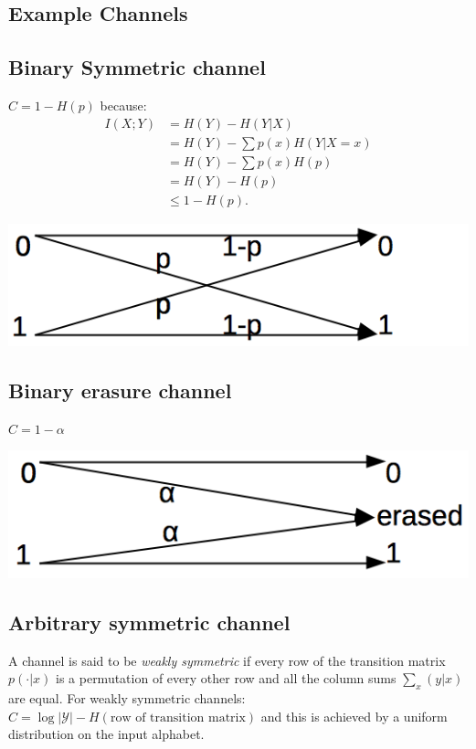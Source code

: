\documentclass[10pt,a4paper,landscape]{article}
\begin{document}
\begin{multicols*}{4}
\section{Example Channels}
\subsection{Binary Symmetric channel}
$C = 1 - H(p)$ because:
\begin{align*}
	I(X; Y) &= H(Y) - H(Y | X)\\
			&= H(Y) - \sum p(x) H(Y| X = x)\\
			&= H(Y) - \sum p(x) H(p)\\
			&= H(Y) - H(p)\\
			&\leq 1 - H(p).
\end{align*}
\begin{colfig}
	\centering
	\includegraphics[width=0.6\linewidth]{binary-symmetric-channel.png}
\end{colfig}

\subsection{Binary erasure channel}
$C = 1 - \alpha$
\begin{colfig}
	\centering
	\includegraphics[width=0.6\linewidth]{binary-erasure-channel.png}
\end{colfig}

\subsection{Arbitrary symmetric channel}
A channel is said to be \emph{weakly symmetric} if every row of the transition matrix $p(\cdot | x)$ is a permutation of every other row and all the column sums $\sum_x (y|x)$ are equal. For weakly symmetric channels:
$C = \log | \mathcal{Y} | - H(\text{row of transition matrix})$
and this is achieved by a uniform distribution on the input alphabet.


\end{multicols*}
\end{document}
